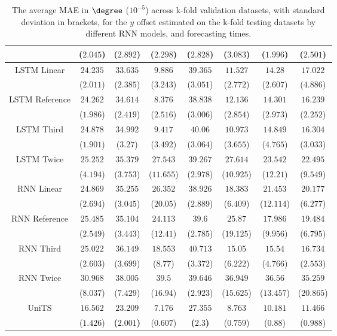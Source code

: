 \begin{table}[!ht]
{\begin{tabular}{|c|c|c|c|c|c|c|c|}
			 & ($2.045$) & ($2.892$) & ($2.298$) & ($2.828$) & ($3.083$) & ($1.996$) & ($2.501$) \\ \hline
			\multirow{2}{*}{LSTM Linear} & $24.235$ & $33.635$ & $9.886$ & $39.365$ & $11.527$ & $14.28$ & $17.022$ \\
			 & ($2.011$) & ($2.385$) & ($3.243$) & ($3.051$) & ($2.772$) & ($2.607$) & ($4.886$) \\ \hline
			\multirow{2}{*}{LSTM Reference} & $24.262$ & $34.614$ & $8.376$ & $38.838$ & $12.136$ & $14.301$ & $16.239$ \\
			 & ($1.986$) & ($2.419$) & ($2.516$) & ($3.006$) & ($2.854$) & ($2.973$) & ($2.252$) \\ \hline
			\multirow{2}{*}{LSTM Third} & $24.878$ & $34.992$ & $9.417$ & $40.06$ & $10.973$ & $14.849$ & $16.304$ \\
			 & ($1.901$) & ($3.27$) & ($3.492$) & ($3.064$) & ($3.655$) & ($4.765$) & ($3.033$) \\ \hline
			\multirow{2}{*}{LSTM Twice} & $25.252$ & $35.379$ & $27.543$ & $39.267$ & $27.614$ & $23.542$ & $22.495$ \\
			 & ($4.194$) & ($3.753$) & ($11.655$) & ($2.978$) & ($10.925$) & ($12.21$) & ($9.549$) \\ \hline
			\multirow{2}{*}{RNN Linear} & $24.869$ & $35.255$ & $26.352$ & $38.926$ & $18.383$ & $21.453$ & $20.177$ \\
			 & ($2.694$) & ($3.045$) & ($20.05$) & ($2.889$) & ($6.409$) & ($12.114$) & ($6.277$) \\ \hline
			\multirow{2}{*}{RNN Reference} & $25.485$ & $35.104$ & $24.113$ & $39.6$ & $25.87$ & $17.986$ & $19.484$ \\
			 & ($2.549$) & ($3.443$) & ($12.41$) & ($2.785$) & ($19.125$) & ($9.956$) & ($6.795$) \\ \hline
			\multirow{2}{*}{RNN Third} & $25.022$ & $36.149$ & $18.553$ & $40.713$ & $15.05$ & $15.54$ & $16.734$ \\
			 & ($2.603$) & ($3.699$) & ($8.77$) & ($3.372$) & ($6.222$) & ($4.766$) & ($2.553$) \\ \hline
			\multirow{2}{*}{RNN Twice} & $30.968$ & $38.005$ & $39.5$ & $39.646$ & $36.949$ & $36.56$ & $35.259$ \\
			 & ($8.037$) & ($7.429$) & ($16.94$) & ($2.923$) & ($15.625$) & ($13.457$) & ($20.865$) \\ \hline
			\multirow{2}{*}{UniTS} & $16.562$ & $\mathbf{23.209}$ & $7.176$ & $\mathbf{27.355}$ & $8.763$ & $10.181$ & $11.466$ \\
			 & ($1.426$) & \textbf{(}$\mathbf{2.001}$\textbf{)} & ($0.607$) & \textbf{(}$\mathbf{2.3}$\textbf{)} & ($0.759$) & ($0.88$) & ($0.988$) \\ \hline
		\end{tabular}
	}
	\caption{The average MAE in $\degree$ ($10^{-5}$) across k-fold validation datasets, with standard deviation in brackets, for the $y$ offset estimated on the k-fold testing datasets by different RNN models, and forecasting times.}
	\label{tab:all_latitude_no_abs_MAE}
\end{table}

